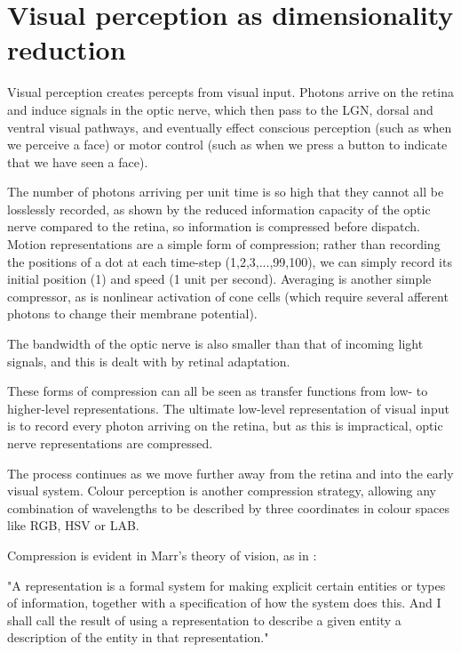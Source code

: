 \section{Visual perception as dimensionality reduction}

Visual perception creates percepts from visual input. Photons arrive on the retina and induce signals in the optic nerve, which then pass to the LGN, dorsal and ventral visual pathways, and eventually effect conscious perception (such as when we perceive a face) or motor control (such as when we press a button to indicate that we have seen a face).

The number of photons arriving per unit time is so high that they cannot all be losslessly recorded, as shown by the reduced information capacity of the optic nerve\cite{wolff1993computing} compared to the retina, so information is compressed before dispatch. Motion representations are a simple form of compression; rather than recording the positions of a dot at each time-step (1,2,3,...,99,100), we can simply record its initial position (1) and speed (1 unit per second). Averaging is another simple compressor, as is nonlinear activation of cone cells (which require several afferent photons to change their membrane potential).


The bandwidth of the optic nerve is also smaller than that of incoming light signals, and this is dealt with by retinal adaptation.


These forms of compression can all be seen as transfer functions from low- to higher-level representations. The ultimate low-level representation of visual input is to record every photon arriving on the retina, but as this is impractical, optic nerve representations are compressed.

The process continues as we move further away from the retina and into the early visual system. Colour perception is another compression strategy, allowing any combination of wavelengths to be described by three coordinates in colour spaces like RGB, HSV or LAB.

Compression is evident in Marr's theory of vision, as in \cite{marr1978representation}:

"A representation is a formal system for making explicit certain entities or types of information, together with a specification of how the system does this. And I shall call the result of using a representation to describe a given entity a description of the entity in that representation."

